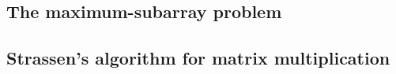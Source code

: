 \subsection{The maximum-subarray problem}


\subsection{Strassen's algorithm for matrix multiplication}

